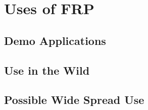 \chapter{Uses of FRP}

  \section{Demo Applications}
  
  \section{Use in the Wild}
  
  \section{Possible Wide Spread Use}
